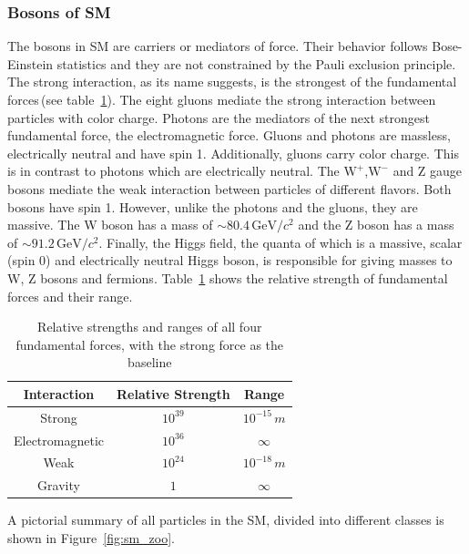 \subsubsection{Bosons of SM}
The bosons in SM are carriers or mediators of force. Their behavior follows Bose-Einstein statistics and they are not constrained by the Pauli exclusion principle. The strong interaction, as its name suggests, is the strongest of the fundamental forces\,(see table~\ref{tab:forces}). The eight gluons mediate the strong interaction between particles with color charge. Photons are the mediators of the next strongest fundamental force, the electromagnetic force. Gluons and photons are massless, electrically neutral and have spin 1. Additionally, gluons carry color charge. This is in contrast to photons which are electrically neutral. The $\mathrm{W}^+$,$\mathrm{W}^-$ and Z gauge bosons mediate the weak interaction between particles of different flavors. Both bosons have spin 1. However, unlike the photons and the gluons, they are massive. The W boson has a mass of $\sim 80.4\,\mathrm{GeV}/c^2$ and the Z boson has a mass of $\sim 91.2\,\mathrm{GeV}/c^2$. Finally, the Higgs field, the quanta of which is a massive, scalar (spin 0) and electrically neutral Higgs boson, is responsible for giving masses to W, Z bosons and fermions. Table~\ref{tab:forces} shows the relative strength of fundamental forces and their range.         

\begin{table}[hbtp]
\begin{center}
\caption{Relative strengths and ranges of all four fundamental forces, with the strong force as the baseline}
\begin{tabular}{c|c|c}
\hline
Interaction & Relative Strength & Range \\
\hline
Strong & $10^{39}$ & $10^{-15}\,m$\\
Electromagnetic & $10^{36}$& $\infty$\\
Weak &  $10^{24}$ &$10^{-18}\,m$\\
Gravity & $1$ &$\infty$\\
\hline
\end{tabular}
\label{tab:forces}
\end{center}
\end{table}

A pictorial summary of all particles in the SM, divided into different classes is shown in Figure~\ref{fig:sm_zoo}.

